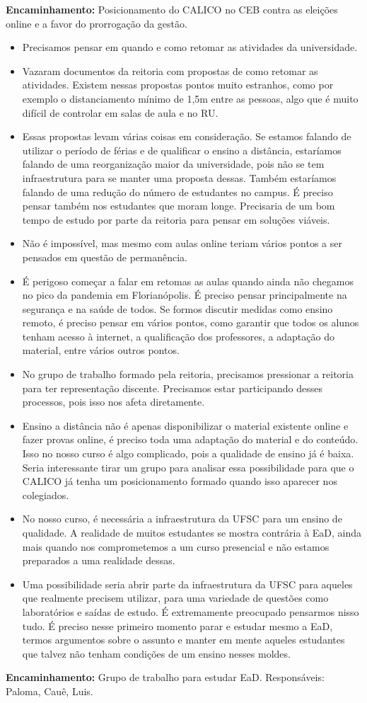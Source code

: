 \documentclass{ata-calico}
\begin{document}
\textbf{Encaminhamento:} Posicionamento do CALICO no CEB contra as eleições online e a favor do prorrogação da gestão.

\begin{itemize}
\item Precisamos pensar em quando e como retomar as atividades da universidade.
\item Vazaram documentos da reitoria com propostas de como retomar as atividades. Existem nessas propostas pontos muito estranhos, como por exemplo o distanciamento mínimo de 1,5m entre as pessoas, algo que é muito difícil de controlar em salas de aula e no RU.
\item Essas propostas levam várias coisas em consideração. Se estamos falando de utilizar o período de férias e de qualificar o ensino a distância, estaríamos falando de uma reorganização maior da universidade, pois não se tem infraestrutura para se manter uma proposta dessas. Também estaríamos falando de uma redução do número de estudantes no campus. É preciso pensar também nos estudantes que moram longe. Precisaria de um bom tempo de estudo por parte da reitoria para pensar em soluções viáveis.
\item Não é impossível, mas mesmo com aulas online teriam vários pontos a ser pensados em questão de permanência.
\item É perigoso começar a falar em retomas as aulas quando ainda não chegamos no pico da pandemia em Florianópolis. É preciso pensar principalmente na segurança e na saúde de todos. Se formos discutir medidas como ensino remoto, é preciso pensar em vários pontos, como garantir que todos os alunos tenham acesso à internet, a qualificação dos professores, a adaptação do material, entre vários outros pontos.
\item No grupo de trabalho formado pela reitoria, precisamos pressionar a reitoria para ter representação discente. Precisamos estar participando desses processos, pois isso nos afeta diretamente.
\item Ensino a distância não é apenas disponibilizar o material existente online e fazer provas online, é preciso toda uma adaptação do material e do conteúdo. Isso no nosso curso é algo complicado, pois a qualidade de ensino já é baixa. Seria interessante tirar um grupo para analisar essa possibilidade para que o CALICO já tenha um posicionamento formado quando isso aparecer nos colegiados.
\item No nosso curso, é necessária a infraestrutura da UFSC para um ensino de qualidade. A realidade de muitos estudantes se mostra contrária à EaD, ainda mais quando nos comprometemos a um curso presencial e não estamos preparados a uma realidade dessas.
\item Uma possibilidade seria abrir parte da infraestrutura da UFSC para aqueles que realmente precisem utilizar, para uma variedade de questões como laboratórios e saídas de estudo. É extremamente preocupado pensarmos nisso tudo. É preciso nesse primeiro momento parar e estudar mesmo a EaD, termos argumentos sobre o assunto e manter em mente aqueles estudantes que talvez não tenham condições de um ensino nesses moldes.
\end{itemize}

\textbf{Encaminhamento:} Grupo de trabalho para estudar EaD. Responsáveis: Paloma, Cauê, Luis.

\end{document}
